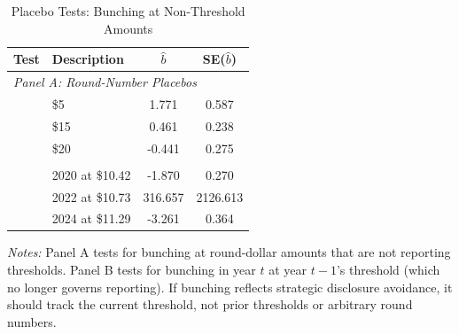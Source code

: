 \begin{table}[t]
\centering
\caption{Placebo Tests: Bunching at Non-Threshold Amounts}
\label{tab:placebo}
\begin{threeparttable}
\begin{tabular}{llcc}
\toprule
Test & Description & $\hat{b}$ & SE($\hat{b}$) \\
\midrule
\multicolumn{4}{l}{\textit{Panel A: Round-Number Placebos}} \\
\addlinespace
 & \$5 & 1.771 & 0.587 \\
 & \$15 & 0.461 & 0.238 \\
 & \$20 & -0.441 & 0.275 \\
\addlinespace
\multicolumn{4}{l}{\textit{Panel B: Prior-Year Threshold Placebos}} \\
\addlinespace
 & 2020 at \$10.42 & -1.870 & 0.270 \\
 & 2022 at \$10.73 & 316.657 & 2126.613 \\
 & 2024 at \$11.29 & -3.261 & 0.364 \\
\bottomrule
\end{tabular}
\begin{tablenotes}
\item \textit{Notes:} Panel A tests for bunching at round-dollar amounts that are not
reporting thresholds. Panel B tests for bunching in year $t$ at year $t-1$'s threshold
(which no longer governs reporting). If bunching reflects strategic disclosure avoidance,
it should track the current threshold, not prior thresholds or arbitrary round numbers.
\end{tablenotes}
\end{threeparttable}
\end{table}

